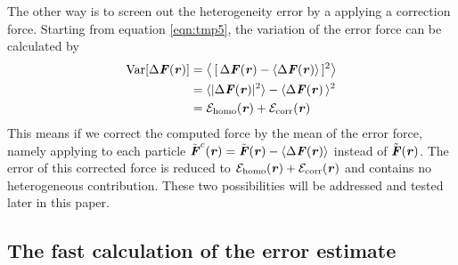 \documentclass[aps,pre,preprint]{revtex4}
\renewcommand{\v}[1]{\textbf{\textit{#1}}}
\renewcommand{\d}[1]{\textsf{#1}}
\begin{document}
The other way is to screen out the heterogeneity error by a applying a
correction force.  Starting from equation \eqref{eqn:tmp5}, the
variation of the error force can be calculated by
\begin{align} \nonumber
  \textrm{Var}[\Delta\v F(\v r)]
  & =
  \big\langle\,
  [\,\Delta\v F(\v r) - \langle\Delta\v F(\v r)\rangle\,]^2
  \big\rangle \\\nonumber
  & =
  \langle\vert\Delta\v F(\v r)\vert^2\rangle -
  \langle\Delta\v F(\v r)\,\rangle^2 \\
  & =
  \mathcal E_{\textrm{homo}}(\v r) +
  \mathcal E_{\textrm{corr}}(\v r)  
\end{align}
This means if we correct the computed force by the mean of the error
force, namely applying to each particle $\tilde{\v F}^c(\v r) =
\tilde{\v F}(\v r) - \langle\Delta\v F(\v r)\rangle$ instead of
$\tilde{\v F}(\v r)$. The error of this corrected force is reduced to
$\mathcal E_{\textrm{homo}}(\v r) + \mathcal E_{\textrm{corr}}(\v r)$
and contains no heterogeneous contribution.  These two possibilities
will be addressed and tested later in this paper.


\subsection{The fast calculation of the error estimate}\label{sec:tmp1.3}
\end{document}
